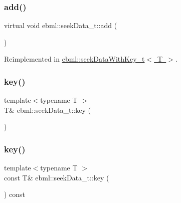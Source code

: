 \subsubsection{\texorpdfstring{add()}{add()}}
{\footnotesize\ttfamily virtual void ebml\+::seek\+Data\+\_\+t\+::add (\begin{DoxyParamCaption}\item[{std\+::unordered\+\_\+map$<$ \mbox{\hyperlink{namespaceebml_a86c5f604ddf12a74aa9812e997a58691}{ebml\+I\+D\+\_\+t}}, std\+::unique\+\_\+ptr$<$ \mbox{\hyperlink{classebml_1_1seekMapBase}{seek\+Map\+Base}} $>$$>$ \&}]{ }\end{DoxyParamCaption})\hspace{0.3cm}{\ttfamily [virtual]}}



Reimplemented in \mbox{\hyperlink{classebml_1_1seekDataWithKey__t_a4997f1c29bd331a1e6d8c5293f7d4730}{ebml\+::seek\+Data\+With\+Key\+\_\+t$<$ T $>$}}.

\mbox{\label{classebml_1_1seekData__t_a1dec5e33c576eecc5685796c28dca712}} 
\subsubsection{\texorpdfstring{key()}{key()}\hspace{0.1cm}{\footnotesize\ttfamily [1/2]}}
{\footnotesize\ttfamily template$<$typename T $>$ \\
T\& ebml\+::seek\+Data\+\_\+t\+::key (\begin{DoxyParamCaption}{ }\end{DoxyParamCaption})}

\mbox{\label{classebml_1_1seekData__t_a9a3356fbd22caa75a6df703e3e2f2ca6}} 
\subsubsection{\texorpdfstring{key()}{key()}\hspace{0.1cm}{\footnotesize\ttfamily [2/2]}}
{\footnotesize\ttfamily template$<$typename T $>$ \\
const T\& ebml\+::seek\+Data\+\_\+t\+::key (\begin{DoxyParamCaption}{ }\end{DoxyParamCaption}) const}

